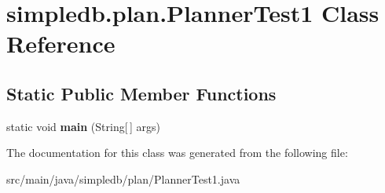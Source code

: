 \hypertarget{classsimpledb_1_1plan_1_1PlannerTest1}{}\section{simpledb.\+plan.\+Planner\+Test1 Class Reference}
\label{classsimpledb_1_1plan_1_1PlannerTest1}
\subsection*{Static Public Member Functions}
\begin{DoxyCompactItemize}
\item 
\mbox{\label{classsimpledb_1_1plan_1_1PlannerTest1_a7ce5d2ee3cd7a933f8fa5a726c859db5}} 
static void {\bfseries main} (String\mbox{[}$\,$\mbox{]} args)
\end{DoxyCompactItemize}


The documentation for this class was generated from the following file\+:\begin{DoxyCompactItemize}
\item 
src/main/java/simpledb/plan/Planner\+Test1.\+java\end{DoxyCompactItemize}
